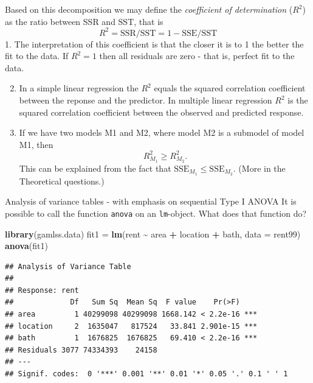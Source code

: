 \documentclass[
  ignorenonframetext,
]{beamer}
\newenvironment{Shaded}{\begin{snugshade}}{\end{snugshade}}
\newcommand{\AttributeTok}[1]{\textcolor[rgb]{0.13,0.29,0.53}{#1}}
\newcommand{\FunctionTok}[1]{\textcolor[rgb]{0.13,0.29,0.53}{\textbf{#1}}}
\newcommand{\NormalTok}[1]{#1}
\newcommand{\OtherTok}[1]{\textcolor[rgb]{0.56,0.35,0.01}{#1}}
\newcommand{\SpecialCharTok}[1]{\textcolor[rgb]{0.81,0.36,0.00}{\textbf{#1}}}
\begin{document}
\begin{frame}
Based on this decomposition we may define the \emph{coefficient of
determination} (\(R^2\)) as the ratio between SSR and SST, that is
\[R^2=\text{SSR}/\text{SST}=1-\text{SSE}/\text{SST}\] 1. The
interpretation of this coefficient is that the closer it is to 1 the
better the fit to the data. If \(R^2=1\) then all residuals are zero -
that is, perfect fit to the data.

\begin{enumerate}
\setcounter{enumi}{1}
\item
  In a simple linear regression the \(R^2\) equals the squared
  correlation coefficient between the reponse and the predictor. In
  multiple linear regression \(R^2\) is the squared correlation
  coefficient between the observed and predicted response.
\item
  If we have two models M1 and M2, where model M2 is a submodel of model
  M1, then \[ R^2_{M_1}\ge R^2_{M_2}.\] This can be explained from the
  fact that \(\text{SSE}_{M_1}\le \text{SSE}_{M_2}\). (More in the
  Theoretical questions.)
\end{enumerate}
\end{frame}

\begin{frame}[fragile]
\begin{block}{Analysis of variance tables - with emphasis on sequential
Type I ANOVA}
\label{analysis-of-variance-tables---with-emphasis-on-sequential-type-i-anova}
It is possible to call the function \texttt{anova} on an
\texttt{lm}-object. What does that function do?

\begin{Shaded}
\begin{Highlighting}[]
\FunctionTok{library}\NormalTok{(gamlss.data)}
\NormalTok{fit1 }\OtherTok{=} \FunctionTok{lm}\NormalTok{(rent }\SpecialCharTok{\textasciitilde{}}\NormalTok{ area }\SpecialCharTok{+}\NormalTok{ location }\SpecialCharTok{+}\NormalTok{ bath, }\AttributeTok{data =}\NormalTok{ rent99)}
\FunctionTok{anova}\NormalTok{(fit1)}
\end{Highlighting}
\end{Shaded}

\begin{verbatim}
## Analysis of Variance Table
## 
## Response: rent
##             Df   Sum Sq  Mean Sq  F value    Pr(>F)    
## area         1 40299098 40299098 1668.142 < 2.2e-16 ***
## location     2  1635047   817524   33.841 2.901e-15 ***
## bath         1  1676825  1676825   69.410 < 2.2e-16 ***
## Residuals 3077 74334393    24158                       
## ---
## Signif. codes:  0 '***' 0.001 '**' 0.01 '*' 0.05 '.' 0.1 ' ' 1
\end{verbatim}
\end{block}
\end{frame}
\end{document}
